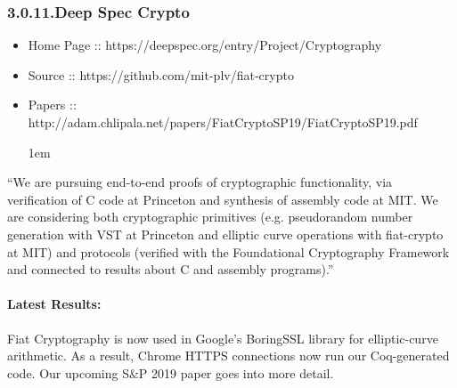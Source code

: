 \documentclass[12pt,twoside]{article}
\begin{document}
\subsubsection{3.0.11.\hspace*{0.5em}Deep Spec Crypto}\label{sec-deep-spec-crypto}%

\begin{itemize}[noitemsep,topsep=\mdcompacttopsep]%

\item{}Home Page :: https://deepspec.org/entry/Project/Cryptography%

\item{}Source :: https://github.com/mit-plv/fiat-crypto%

\item{}Papers :: http://adam.chlipala.net/papers/FiatCryptoSP19/FiatCryptoSP19.pdf
\begin{mdpre}%
\begin{mdbmarginx}{}{}{}{1em}%
\end{mdbmarginx}%
\end{mdpre}%
\end{itemize}%

\noindent{}\textquotedblleft{}We are pursuing end-to-end proofs of cryptographic functionality, via
verification of C code at Princeton and synthesis of assembly code at
MIT.  We are considering both cryptographic primitives
(e.g. pseudorandom number generation with VST at Princeton and
elliptic curve operations with fiat-crypto at MIT) and protocols
(verified with the Foundational Cryptography Framework and connected
to results about C and assembly programs).\textquotedblright{}%

\paragraph{Latest Results:}\label{sec-latest-results-}%

\noindent{}Fiat Cryptography is now used in Google's BoringSSL library for
elliptic-curve arithmetic.  As a result, Chrome HTTPS connections now
run our Coq-generated code.  Our  upcoming S\&P 2019 paper goes into
more detail.%
\end{document}
